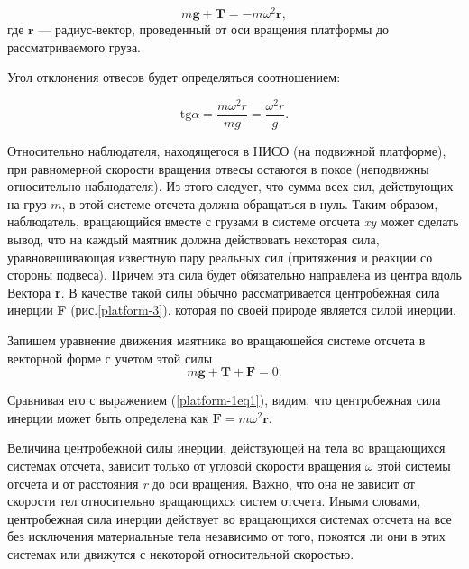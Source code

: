 \documentclass[All.tex]{subfiles}
\begin{document}
\begin{equation}\label{platform-1eq1}
m\textbf{g}+\textbf{T}=-m\omega^{2}\textbf{r},
\end{equation}
где $ \textbf{r} $ — радиус-вектор, проведенный от оси вращения платформы до рассматриваемого груза.

Угол отклонения отвесов будет определяться соотношением:

\begin{equation}\label{platform-1eq2}
\text{tg} \alpha =\frac{m\omega^{2}r}{mg} = \frac{\omega^{2}r}{g}.
\end{equation}

Относительно наблюдателя, находящегося в НИСО (на подвижной платформе), при равномерной скорости вращения отвесы остаются в покое (неподвижны относительно наблюдателя).
Из этого следует, что сумма всех сил, действующих на груз $ m $, в этой системе отсчета должна обращаться в нуль.
Таким образом, наблюдатель, вращающийся вместе с грузами в системе отсчета \textit{xy} может сделать вывод, что на каждый маятник должна действовать некоторая сила, уравновешивающая известную пару реальных сил (притяжения и реакции со стороны подвеса).
Причем эта сила будет обязательно направлена из центра вдоль Вектора \textbf{r}. 
В качестве такой силы обычно рассматривается центробежная сила инерции \textbf{F} (рис.\ref{platform-3}), которая по своей природе является силой инерции.

Запишем уравнение движения маятника во вращающейся системе отсчета в векторной форме с учетом этой силы
\begin{equation}\label{platform-1eq3}
m\textbf{g}+\textbf{T}+\textbf{F}=0.
\end{equation}

Сравнивая его с выражением (\ref{platform-1eq1}), видим, что центробежная сила инерции может быть определена как $ \textbf{F}=m\omega^{2}\textbf{r} $.

Величина центробежной силы инерции, действующей на тела во вращающихся системах отсчета, зависит только от угловой скорости вращения $ \omega $ этой системы отсчета и от расстояния \textit{r} до оси вращения.
Важно, что она не зависит от скорости тел относительно вращающихся систем отсчета.
Иными словами, центробежная сила инерции действует во вращающихся системах отсчета на все без исключения материальные тела независимо от того, покоятся ли они в этих системах или движутся с некоторой относительной скоростью.
				
\end{document}
